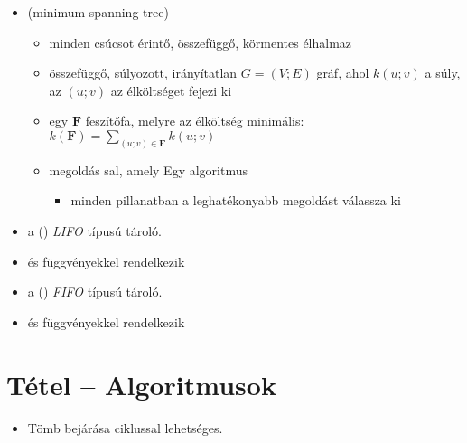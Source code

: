 \documentclass[main.tex]{subfiles}
\begin{document}
\begin{itemize}
    \item {}
    (minimum spanning tree)
    \begin{itemize}
      \item minden csúcsot érintő, összefüggő,
      körmentes élhalmaz

      \item {} összefüggő, súlyozott,
      irányítatlan $G = (V; E)$ gráf, ahol $k(u; v)$
      a súly, az $(u;v)$ az élköltséget fejezi ki

      \item {} egy $\mathbf{F}$ feszítőfa,
      melyre az élköltség minimális:
      $k(\mathbf{F}) = \displaystyle\sum_{(u;v) \in \mathbf{F}} k(u;v)$
      
      \item megoldás sal, amely Egy
       algoritmus
      \begin{itemize}
        \item minden pillanatban a leghatékonyabb megoldást válassza ki
      \end{itemize}
    \end{itemize}
  \end{itemize}

  \begin{itemize}
    \item a  () \textit{LIFO}
    típusú tároló.

    \item {} és  függvényekkel rendelkezik
  \end{itemize}

  \begin{itemize}
    \item a  () \textit{FIFO}
    típusú tároló.

    \item {} és  függvényekkel rendelkezik
  \end{itemize}



  \section{Tétel – Algoritmusok} %
  
  \begin{itemize}
    \item Tömb bejárása  ciklussal lehetséges.
  \end{itemize}
  
\end{document}
